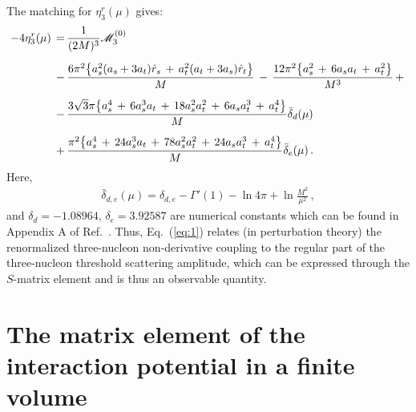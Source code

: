 \documentclass[12pt,prd,tightenlines,nofootinbib]{revtex4-2}
\newcommand{\eq}{\begin{eqnarray}}
\newcommand{\en}{\end{eqnarray}}
\begin{document}
The matching for $\eta_3^r(\mu)$ gives:
\begin{align}
-  4\eta_{3}^{r}(\mu)\, =\,&
  \frac{1}{(2M)^{3}}\mathscr{M}_{3}^{(0)}\nonumber\\[2mm]
  \,-\,&\frac{6\pi^{2}\big\{ a_{s}^{2}(a_{s} + 3a_{t})\Hat{r}_{s} \, +\, a_{t}^{2}(a_{t} + 3a_{s})\Hat{r}_{t} \big\}}{M}\,-\, \frac{12 \pi^{2}\big\{ a_{s}^{2} \, + \, 6a_{s}a_{t} \, + \, a_{t}^{2} \big\}}{M^{3}}\, +\,
\nonumber\\[2mm]
    \,-\,&\frac{3\sqrt{3}\pi\big\{ a_{s}^{4}\, +\, 6a_{s}^{3}a_{t} \, +\, 18 a_{s}^{2}a_{t}^{2}\, + \, 6a_{s}a_{t}^{3}\, +\, a_{t}^{4} \big\}}{M}\bar\delta_{d}(\mu)\nonumber\\[2mm]
    \,+\,& \frac{\pi^{2}\big\{ a_{s}^{4}\, +\, 24a_{s}^{3}a_{t} \, +\, 78 a_{s}^{2}a_{t}^{2}\, + \, 24a_{s}a_{t}^{3}\, +\, a_{t}^{4} \big\}}{M}\bar\delta_{e}(\mu)\,.\label{eq:1}
\end{align}
Here,
\eq
\bar\delta_{d,e}(\mu)=\delta_{d,e}-\Gamma'(1)-\ln 4\pi+\ln\frac{M^2}{\mu^2}\, ,
\en
and
$\delta_{d} = -1.08964$, $\delta_{e} = 3.92587$ are numerical constants
which can be found in Appendix A of Ref.~\cite{Romero-Lopez:2020rdq}. Thus,
Eq.~(\ref{eq:1}) relates (in perturbation theory)
the renormalized three-nucleon non-derivative coupling
to the regular part of the three-nucleon threshold scattering amplitude, which can
be expressed through the $S$-matrix element and is thus an observable quantity.

\section{The matrix element of the interaction potential in a finite volume}
\label{sec:energyshift}
\end{document}
